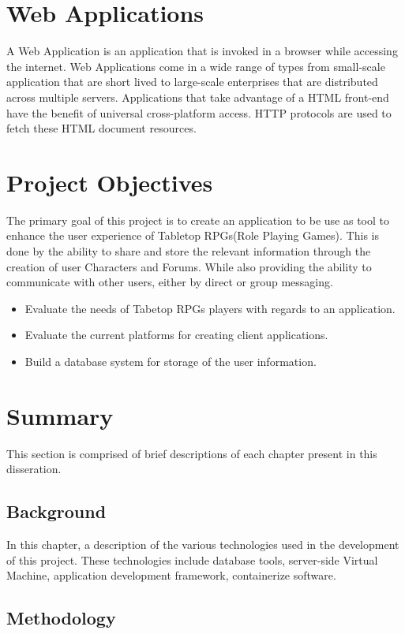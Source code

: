 \section{Web Applications}
A Web Application is an application that is invoked in a browser while accessing the internet.  Web Applications come in a wide range of types from small-scale application that are short lived to large-scale enterprises that are distributed across multiple servers.  Applications that take advantage of a HTML front-end have the benefit of universal cross-platform access. \cite{hadley2006web} HTTP protocols are used to fetch these HTML document resources.

\section{Project Objectives}
The primary goal of this project is to create an application to be use as tool to enhance the user experience of Tabletop RPGs(Role Playing Games).  This is done by the ability to share and store the relevant information through the creation of user Characters and Forums. While also providing the ability to communicate with other users, either by direct or group messaging.

\begin{itemize}
  \item Evaluate the needs of Tabetop RPGs players with regards to an application.
  \item Evaluate the current platforms for creating client applications.
  \item Build a database system for storage of the user information.
\end{itemize}

\section{Summary}
This section is comprised of brief descriptions of each chapter present in this disseration.

\subsection{Background}
In this chapter, a description of the various technologies used in the development of this project. These technologies include database tools, server-side Virtual Machine, application development framework, containerize software.
\subsection{Methodology}

